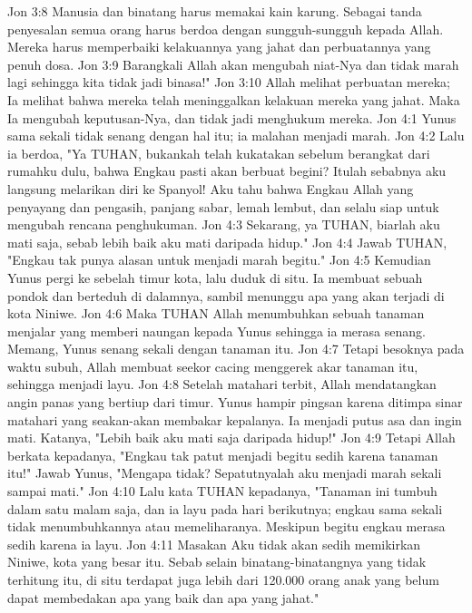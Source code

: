 Jon 3:8  Manusia dan binatang harus memakai kain karung. Sebagai tanda penyesalan semua orang harus berdoa dengan sungguh-sungguh kepada Allah. Mereka harus memperbaiki kelakuannya yang jahat dan perbuatannya yang penuh dosa.
Jon 3:9  Barangkali Allah akan mengubah niat-Nya dan tidak marah lagi sehingga kita tidak jadi binasa!"
Jon 3:10  Allah melihat perbuatan mereka; Ia melihat bahwa mereka telah meninggalkan kelakuan mereka yang jahat. Maka Ia mengubah keputusan-Nya, dan tidak jadi menghukum mereka.
Jon 4:1  Yunus sama sekali tidak senang dengan hal itu; ia malahan menjadi marah.
Jon 4:2  Lalu ia berdoa, "Ya TUHAN, bukankah telah kukatakan sebelum berangkat dari rumahku dulu, bahwa Engkau pasti akan berbuat begini? Itulah sebabnya aku langsung melarikan diri ke Spanyol! Aku tahu bahwa Engkau Allah yang penyayang dan pengasih, panjang sabar, lemah lembut, dan selalu siap untuk mengubah rencana penghukuman.
Jon 4:3  Sekarang, ya TUHAN, biarlah aku mati saja, sebab lebih baik aku mati daripada hidup."
Jon 4:4  Jawab TUHAN, "Engkau tak punya alasan untuk menjadi marah begitu."
Jon 4:5  Kemudian Yunus pergi ke sebelah timur kota, lalu duduk di situ. Ia membuat sebuah pondok dan berteduh di dalamnya, sambil menunggu apa yang akan terjadi di kota Niniwe.
Jon 4:6  Maka TUHAN Allah menumbuhkan sebuah tanaman menjalar yang memberi naungan kepada Yunus sehingga ia merasa senang. Memang, Yunus senang sekali dengan tanaman itu.
Jon 4:7  Tetapi besoknya pada waktu subuh, Allah membuat seekor cacing menggerek akar tanaman itu, sehingga menjadi layu.
Jon 4:8  Setelah matahari terbit, Allah mendatangkan angin panas yang bertiup dari timur. Yunus hampir pingsan karena ditimpa sinar matahari yang seakan-akan membakar kepalanya. Ia menjadi putus asa dan ingin mati. Katanya, "Lebih baik aku mati saja daripada hidup!"
Jon 4:9  Tetapi Allah berkata kepadanya, "Engkau tak patut menjadi begitu sedih karena tanaman itu!" Jawab Yunus, "Mengapa tidak? Sepatutnyalah aku menjadi marah sekali sampai mati."
Jon 4:10  Lalu kata TUHAN kepadanya, "Tanaman ini tumbuh dalam satu malam saja, dan ia layu pada hari berikutnya; engkau sama sekali tidak menumbuhkannya atau memeliharanya. Meskipun begitu engkau merasa sedih karena ia layu.
Jon 4:11  Masakan Aku tidak akan sedih memikirkan Niniwe, kota yang besar itu. Sebab selain binatang-binatangnya yang tidak terhitung itu, di situ terdapat juga lebih dari 120.000 orang anak yang belum dapat membedakan apa yang baik dan apa yang jahat."


